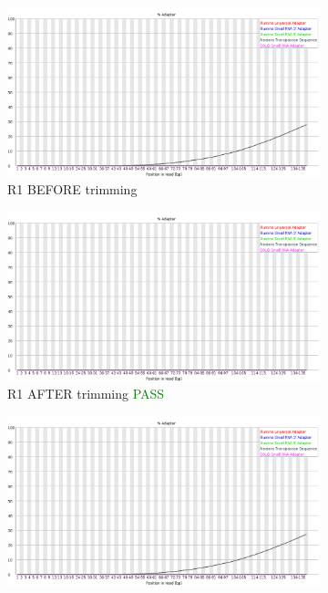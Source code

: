 \documentclass{article}
\begin{document}
\begin{figure}[!htb]
\caption{Adapter Content}
\centering
\begin{subfigure}{0.45\linewidth}
\includegraphics[width=\linewidth]{04-D15-22373-HT-Nextera-Myeloid-Val1-Repeat_S4_L001_R1_001_fastqc/Images/adapter_content.png}
\caption{R1 BEFORE trimming}
\end{subfigure}
\begin{subfigure}{0.45\linewidth}
\includegraphics[width=\linewidth]{04-D15-22373-HT-Nextera-Myeloid-Val1-Repeat_S4_L001_R1_001.qfilter_fastqc/Images/adapter_content.png}
\caption{R1 AFTER trimming \textcolor{green}{PASS}}
\end{subfigure}
\begin{subfigure}{0.45\linewidth}
\includegraphics[width=\linewidth]{04-D15-22373-HT-Nextera-Myeloid-Val1-Repeat_S4_L001_R2_001_fastqc/Images/adapter_content.png}

\end{subfigure}
\end{figure}
\end{document}
